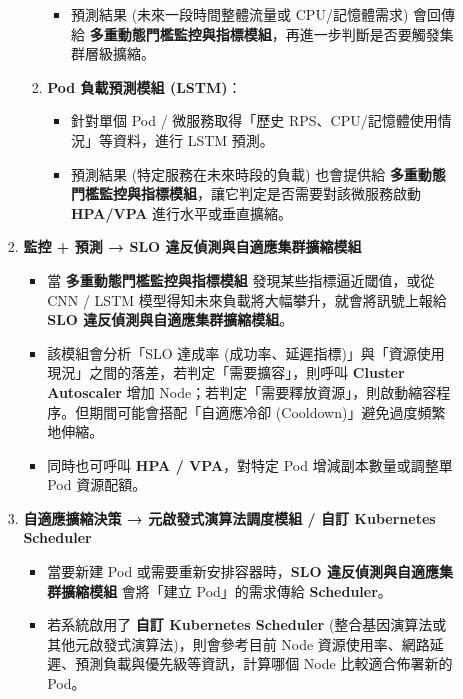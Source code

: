 \documentclass[12pt,a4paper]{article}
\begin{document}
\begin{enumerate}[label={(\zhdig*)}, leftmargin=2\parindent, listparindent=\parindent]
\begin{enumerate}[label={(\arabic*)}, leftmargin=\parindent, listparindent=\parindent]
\begin{enumerate}[label={(\zhdig*)}, leftmargin=\parindent, listparindent=\parindent]
\begin{enumerate}[label={(\arabic*)}, leftmargin=\parindent, listparindent=\parindent]
\begin{itemize}[leftmargin=\parindent, listparindent=\parindent]
            \item 預測結果 (未來一段時間整體流量或 CPU/記憶體需求) 會回傳給 \textbf{多重動態門檻監控與指標模組}，再進一步判斷是否要觸發集群層級擴縮。
        \end{itemize}
        \item \textbf{Pod 負載預測模組 (LSTM)}：
            \begin{itemize}[leftmargin=\parindent, listparindent=\parindent]
                \item 針對單個 Pod / 微服務取得「歷史 RPS、CPU/記憶體使用情況」等資料，進行 LSTM 預測。

                \item 預測結果 (特定服務在未來時段的負載) 也會提供給 \textbf{多重動態門檻監控與指標模組}，讓它判定是否需要對該微服務啟動 \textbf{HPA/VPA} 進行水平或垂直擴縮。
            \end{itemize}
    \end{enumerate}
\item \textbf{監控 + 預測 → SLO 違反偵測與自適應集群擴縮模組}\textbf{}
    \begin{itemize}[leftmargin=\parindent, listparindent=\parindent]

        \item 當 \textbf{多重動態門檻監控與指標模組} 發現某些指標逼近閾值，或從 CNN / LSTM 模型得知未來負載將大幅攀升，就會將訊號上報給 \textbf{SLO 違反偵測與自適應集群擴縮模組}。

        \item 該模組會分析「SLO 達成率 (成功率、延遲指標)」與「資源使用現況」之間的落差，若判定「需要擴容」，則呼叫 \textbf{Cluster Autoscaler} 增加 Node；若判定「需要釋放資源」，則啟動縮容程序。但期間可能會搭配「自適應冷卻 (Cooldown)」避免過度頻繁地伸縮。

        \item 同時也可呼叫 \textbf{HPA / VPA}，對特定 Pod 增減副本數量或調整單 Pod 資源配額。
    \end{itemize}
\item \textbf{自適應擴縮決策 → 元啟發式演算法調度模組 / 自訂 Kubernetes Scheduler}\textbf{}
    \begin{itemize}[leftmargin=\parindent, listparindent=\parindent]

        \item 當要新建 Pod 或需要重新安排容器時，\textbf{SLO 違反偵測與自適應集群擴縮模組} 會將「建立 Pod」的需求傳給 \textbf{Scheduler}。

        \item 若系統啟用了 \textbf{自訂 Kubernetes Scheduler} (整合基因演算法或其他元啟發式演算法)，則會參考目前 Node 資源使用率、網路延遲、預測負載與優先級等資訊，計算哪個 Node 比較適合佈署新的 Pod。


\end{itemize}
\end{enumerate}
\end{enumerate}
\end{enumerate}
\end{document}
